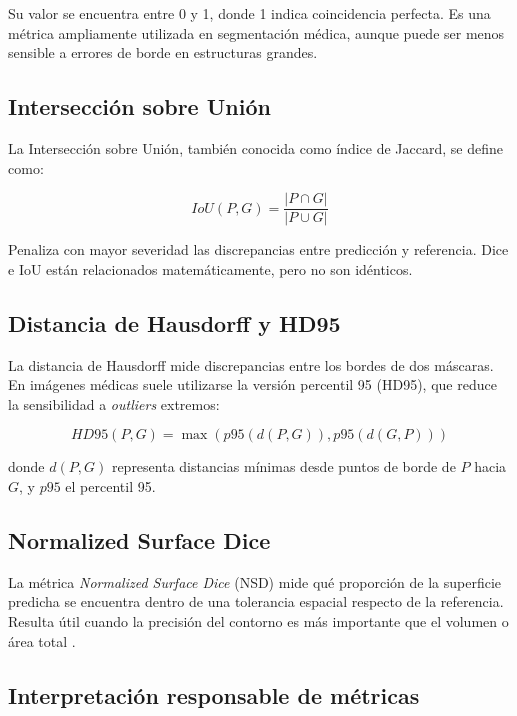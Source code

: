 Su valor se encuentra entre 0 y 1, donde 1 indica coincidencia perfecta. Es una métrica ampliamente utilizada en segmentación médica, aunque puede ser menos sensible a errores de borde en estructuras grandes.

\subsection{Intersección sobre Unión}

La Intersección sobre Unión, también conocida como índice de Jaccard, se define como:

\begin{equation}
IoU(P,G)=\frac{|P \cap G|}{|P \cup G|}
\end{equation}

Penaliza con mayor severidad las discrepancias entre predicción y referencia. Dice e IoU están relacionados matemáticamente, pero no son idénticos.

\subsection{Distancia de Hausdorff y HD95}

La distancia de Hausdorff mide discrepancias entre los bordes de dos máscaras. En imágenes médicas suele utilizarse la versión percentil 95 (HD95), que reduce la sensibilidad a \textit{outliers} extremos:

\begin{equation}
HD95(P,G)=\max\left(p95(d(P,G)),p95(d(G,P))\right)
\end{equation}

donde $d(P,G)$ representa distancias mínimas desde puntos de borde de $P$ hacia $G$, y $p95$ el percentil 95.

\subsection{Normalized Surface Dice}

La métrica \textit{Normalized Surface Dice} (NSD) mide qué proporción de la superficie predicha se encuentra dentro de una tolerancia espacial respecto de la referencia. Resulta útil cuando la precisión del contorno es más importante que el volumen o área total \parencite{maierhein_metrics_reloaded_2024}.

\subsection{Interpretación responsable de métricas}

